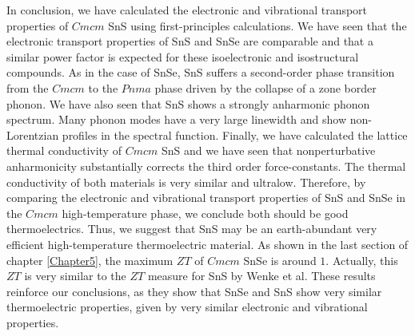 In conclusion, we have calculated the electronic and vibrational transport properties of $Cmcm$ SnS using first-principles calculations. We have seen that the electronic transport properties of SnS and SnSe are comparable and that a
similar power factor is expected for these isoelectronic and isostructural compounds. As in the case of SnSe, SnS suffers a second-order phase transition from the $Cmcm$ to the $Pnma$ phase driven by the collapse of a zone border
phonon. We have also seen that SnS shows a strongly anharmonic phonon spectrum. Many phonon modes have a very large linewidth and show non-Lorentzian profiles in the spectral function. Finally, we have calculated the lattice thermal
conductivity of $Cmcm$ SnS and we have seen that nonperturbative anharmonicity substantially corrects the third order force-constants. The thermal conductivity of both materials is very similar and
ultralow. Therefore, by comparing the electronic and vibrational transport properties of SnS and SnSe in the $Cmcm$ high-temperature phase, we conclude both should be good thermoelectrics. Thus, we suggest that SnS may be an
earth-abundant very efficient high-temperature thermoelectric material. As shown in the last section of chapter \ref{Chapter5}, the maximum $ZT$ of $Cmcm$ SnSe is around $1$. Actually, this $ZT$ is very similar to the $ZT$ measure for SnS by Wenke et al\cite{he2018remarkable}. These results reinforce our conclusions, as they show that SnSe and SnS show very similar thermoelectric properties, given by very similar electronic and vibrational properties. 

